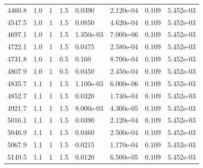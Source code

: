 \documentclass[preview]{standalone}
\begin{document}
{{{\begin{tabular}{L{1.2cm}C{1.2cm} C{0.3cm}C{0.5cm} C{1.4cm}C{1.4cm} C{1.4cm}C{1.4cm}}
  4460.8  &   1.0  & 1     & 1.5 &  0.0390  & 2.120e-04  & 0.109 &  5.452e-03   \\ 
  4547.5  &   1.0  & 1     & 1.5 &  0.0850  & 4.620e-04  & 0.109 &  5.452e-03   \\ 
  4697.1  &   1.0  & 1     & 1.5 &  1.350e-03  & 7.000e-06  & 0.109 &  5.452e-03   \\ 
  4722.1  &   1.0  & 1     & 1.5 &  0.0475  & 2.580e-04  & 0.109 &  5.452e-03   \\ 
  4731.8  &   1.0  & 1     & 0.5 &  0.160  & 8.700e-04  & 0.109 &  5.452e-03   \\ 
  4807.9  &   1.0  & 1     & 0.5 &  0.0450  & 2.450e-04  & 0.109 &  5.452e-03   \\ 
  4835.7  &   1.1  & 1     & 1.5 &  1.100e-03  & 6.000e-06  & 0.109 &  5.452e-03   \\ 
  4852.7  &   1.1  & 1     & 1.5 &  0.0320  & 1.740e-04  & 0.109 &  5.452e-03   \\ 
  4921.7  &   1.1  & 1     & 1.5 &  8.000e-03  & 4.300e-05  & 0.109 &  5.452e-03   \\ 
  5016.1  &   1.1  & 1     & 1.5 &  0.0390  & 2.120e-04  & 0.109 &  5.452e-03   \\ 
  5046.9  &   1.1  & 1     & 1.5 &  0.0460  & 2.500e-04  & 0.109 &  5.452e-03   \\ 
  5067.9  &   1.1  & 1     & 1.5 &  0.0215  & 1.170e-04  & 0.109 &  5.452e-03   \\ 
  5149.5  &   1.1  & 1     & 1.5 &  0.0120  & 6.500e-05  & 0.109 &  5.452e-03   \\ 
\hline 
\end{tabular} 

}}}
\end{document}
